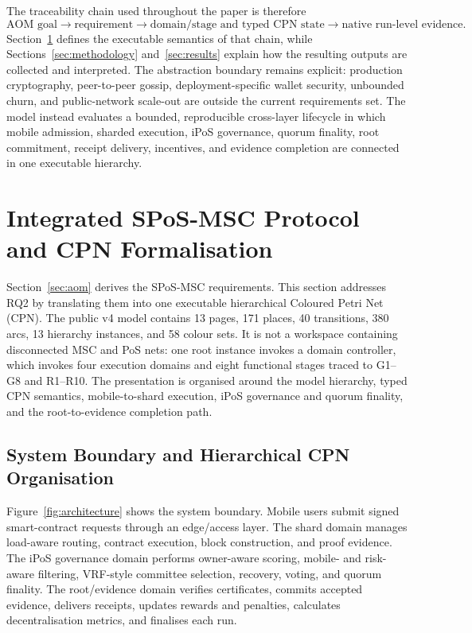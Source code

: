 \documentclass[a4paper,fleqn]{cas-sc}
\begin{document}
The traceability chain used throughout the paper is therefore
\begin{equation}
\text{AOM goal}
\rightarrow
\text{requirement}
\rightarrow
\text{domain/stage and typed CPN state}
\rightarrow
\text{native run-level evidence}.
\end{equation}
Section~\ref{sec:cpn} defines the executable semantics of that chain, while
Sections~\ref{sec:methodology} and~\ref{sec:results} explain how the resulting
outputs are collected and interpreted. The abstraction boundary remains
explicit: production cryptography, peer-to-peer gossip, deployment-specific
wallet security, unbounded churn, and public-network scale-out are outside the
current requirements set. The model instead evaluates a bounded, reproducible
cross-layer lifecycle in which mobile admission, sharded execution, iPoS
governance, quorum finality, root commitment, receipt delivery, incentives,
and evidence completion are connected in one executable hierarchy.

\FloatBarrier


\section{Integrated SPoS-MSC Protocol and CPN Formalisation}
\label{sec:cpn}
\label{sec:framework}

Section~\ref{sec:aom} derives the SPoS-MSC requirements. This section addresses
RQ2 by translating them into one executable hierarchical Coloured Petri Net
(CPN). The public v4 model contains 13 pages, 171 places, 40 transitions,
380 arcs, 13 hierarchy instances, and 58 colour sets. It is not a
workspace containing disconnected MSC and PoS nets: one root instance invokes
a domain controller, which invokes four execution domains and eight functional
stages traced to G1--G8 and R1--R10. The presentation is organised around the
model hierarchy, typed CPN semantics, mobile-to-shard execution, iPoS
governance and quorum finality, and the root-to-evidence completion path.

\subsection{System Boundary and Hierarchical CPN Organisation}
\label{subsec:system_boundary}

Figure~\ref{fig:architecture} shows the system boundary. Mobile users submit
signed smart-contract requests through an edge/access layer. The shard domain
manages load-aware routing, contract execution, block construction, and proof
evidence. The iPoS governance domain performs owner-aware scoring,
mobile- and risk-aware filtering, VRF-style committee selection, recovery,
voting, and quorum finality. The root/evidence domain verifies certificates,
commits accepted evidence, delivers receipts, updates rewards and penalties,
calculates decentralisation metrics, and finalises each run.
\end{document}
